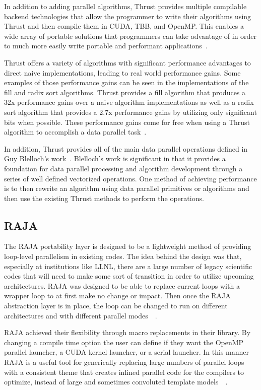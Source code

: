 In addition to adding parallel algorithms, Thrust provides multiple compilable backend technologies that allow the programmer to write their algorithms using Thrust and then compile them in CUDA, TBB, and OpenMP.
%
This enables a wide array of portable solutions that programmers can take advantage of in order to much more easily write portable and performant applications~\cite{thrust}.

Thrust offers a variety of algorithms with significant performance advantages to direct naive implementations, leading to real world performance gains.
%
Some examples of those performance gains can be seen in the implementations of the fill and radix sort algorithms.
Thrust provides a fill algorithm that produces a 32x performance gains over a naive algorithm implementations as well as a radix sort algorithm that provides a 2.7x performance gains by utilizing only significant bits when possible.
%
These performance gains come for free when using a Thrust algorithm to accomplish a data parallel task~\cite{bell2011thrust}.

In addition, Thrust provides all of the main data parallel operations defined in Guy Blelloch's work~\cite{blelloch1990vector}.
%
Blelloch's work is significant in that it provides a foundation for data parallel processing and algorithm development through a series of well defined vectorized operations.
%
One method of achieving performance is to then rewrite an algorithm using data parallel primitives or algorithms and then use the existing Thrust methods to perform the operations.

\subsection*{\textbf{RAJA}}

The RAJA portability layer is designed to be a lightweight method of providing loop-level parallelism in existing codes.
%
The idea behind the design was that, especially at institutions like LLNL, there are a large number of legacy scientific codes that will need to make some sort of transition in order to utilize upcoming architectures.
%
RAJA was designed to be able to replace current loops with a wrapper loop to at first make no change or impact. 
%
Then once the RAJA abstraction layer is in place, the loop can be changed to run on different architectures  and with different parallel modes~\cite{hornung2014raja}~\cite{hornung2016raja}.

RAJA achieved their flexibility through macro replacements in their library.
%
By changing a compile time option the user can define if they want the OpenMP parallel launcher, a CUDA kernel launcher, or a serial launcher.
%
In this manner RAJA is a useful tool for generically replacing large numbers of parallel loops with a consistent theme that creates inlined parallel code for the compilers to optimize, instead of large and sometimes convoluted template models~\cite{hornung2014raja}~\cite{hornung2016raja}.

